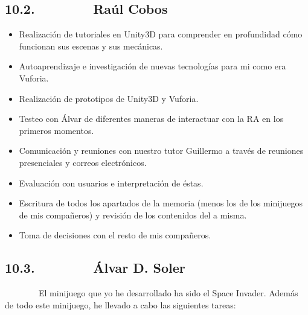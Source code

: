 \subsection{10.2.~~~~~~~~Raúl Cobos}\label{h.4k668n3}

\begin{itemize}
\itemsep1pt\parskip0pt
\item
  Realización de tutoriales en Unity3D para comprender en profundidad
  cómo funcionan sus escenas y sus mecánicas.
\item
  Autoaprendizaje e investigación de nuevas tecnologías para mi como era
  Vuforia.
\item
  Realización de prototipos de Unity3D y Vuforia.
\item
  Testeo con Álvar de diferentes maneras de interactuar con la RA en los
  primeros momentos.
\item
  Comunicación y reuniones con nuestro tutor Guillermo a través de
  reuniones presenciales y correos electrónicos.
\item
  Evaluación con usuarios e interpretación de éstas.
\item
  Escritura de todos los apartados de la memoria (menos los de los
  minijuegos de mis compañeros) y revisión de los contenidos del a
  misma.
\item
  Toma de decisiones con el resto de mis compañeros.
\end{itemize}

\subsection{10.3.~~~~~~~~Álvar D. Soler}\label{h.2zbgiuw}

~~~~~~~~El minijuego que yo he desarrollado ha sido el Space Invader.
Además de todo este minijuego, he llevado a cabo las siguientes tareas:

